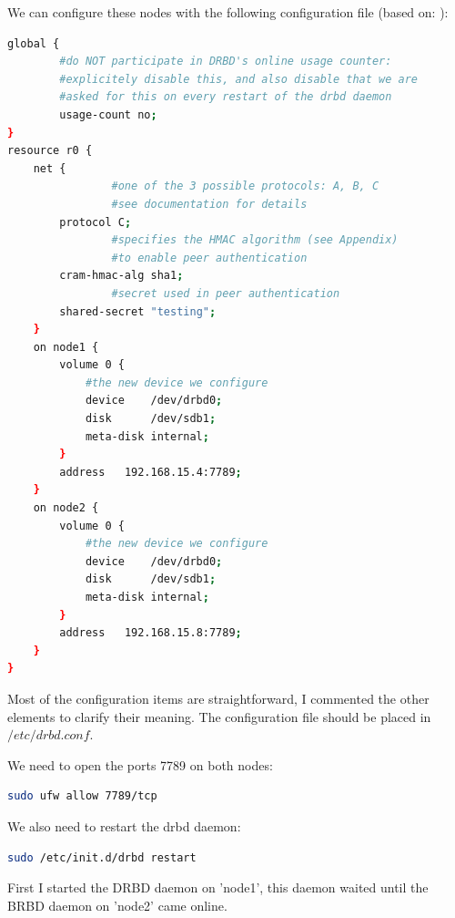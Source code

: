 \documentclass[12pt]{report}
\begin{document}
We can configure these nodes with the following configuration file
(based on: \cite{drbd_ubuntu_doc} \cite{drbd_official_doc}):
\begin{lstlisting}[language=bash]
global {
       	#do NOT participate in DRBD's online usage counter:
       	#explicitely disable this, and also disable that we are
       	#asked for this on every restart of the drbd daemon
       	usage-count no;
}
resource r0 {
	net {
                #one of the 3 possible protocols: A, B, C
                #see documentation for details
		protocol C;
                #specifies the HMAC algorithm (see Appendix)
                #to enable peer authentication
		cram-hmac-alg sha1;
                #secret used in peer authentication
		shared-secret "testing";
	}
	on node1 {
		volume 0 {
			#the new device we configure
			device    /dev/drbd0;
			disk      /dev/sdb1;
			meta-disk internal;
		}
		address   192.168.15.4:7789;
	}
	on node2 {
		volume 0 {
			#the new device we configure
			device    /dev/drbd0;
			disk      /dev/sdb1;
			meta-disk internal;
		}
		address   192.168.15.8:7789;
	}
}
\end{lstlisting}
Most of the configuration items are straightforward, I commented the
other elements to clarify their meaning.
The configuration file should be placed in $/etc/drbd.conf$.

We need to open the ports 7789 on both nodes:
\begin{lstlisting}[language=bash]
sudo ufw allow 7789/tcp
\end{lstlisting}

We also need to restart the drbd daemon: 
\begin{lstlisting}[language=bash]
sudo /etc/init.d/drbd restart
\end{lstlisting}

First I started the DRBD daemon on 'node1', this daemon waited until the
BRBD daemon on 'node2' came online.
\end{document}
